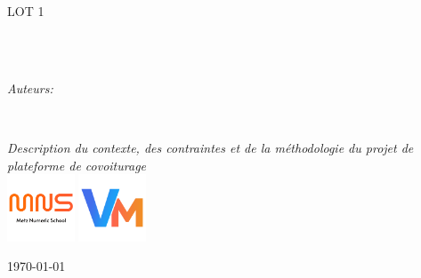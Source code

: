 \documentclass[
12pt, 
french, 
singlespacing,
headsepline,
]{Settings}
\author{Alexandre \textsc{GERARD} \\ Vincent \textsc{GIANGRECO}}
\begin{document}
\frontmatter

\pagestyle{plain}


\begin{titlepage}
\begin{center}

\vspace*{.05\textheight}
{\scshape\LARGE \univname\par}\vspace{1.5cm}
\textsc{\Large LOT 1}\\[0.5cm]

\HRule \\[0.4cm]
{\huge \bfseries \ttitle\par}\vspace{0.4cm}
\HRule \\[1.5cm]
 
\begin{minipage}[t]{1\textwidth}
\begin{center} \large
\emph{Auteurs:}\\
{\authorname}
\end{center}
\end{minipage}
\begin{minipage}[t]{0.4\textwidth}
\end{minipage}\\[3cm]
 
\vfill

\large \textit{Description du contexte, des contraintes et de la méthodologie du projet de plateforme de covoiturage}\\[0.3cm]
\vspace*{15mm}
\includegraphics[width=20mm]{medias/mns.png}
\hspace*{15mm}
\includegraphics[width=20mm]{medias/VM.png}

\vfill

{\large \today}\\[14cm]

 
\vfill
\end{center}
\end{titlepage}
\end{document}
